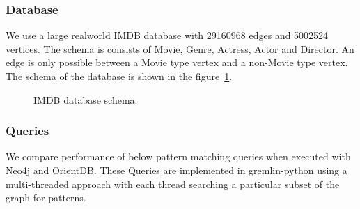 \subsubsection{Database}

We use a large realworld IMDB database with 29160968 edges and 5002524 vertices. The schema is consists of Movie, Genre,
Actress, Actor and Director. An edge is only possible between a Movie type vertex and a non-Movie type vertex. 
The schema of the database is shown in the figure~\ref{fig:schema}. 

\begin{figure}[t]
\centering
{}
\caption{IMDB database schema.}
\label{fig:schema}
\centering
\end{figure}

\subsubsection{Queries}

We compare performance of below pattern matching queries when executed with Neo4j and OrientDB. These Queries are implemented in gremlin-python using a multi-threaded approach with each thread searching a particular subset of the graph for patterns. 

